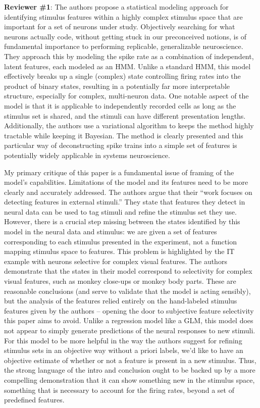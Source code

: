 \documentclass[12pt,a4paper]{article}
\begin{document}
{\bf Reviewer \#1}: The authors propose a statistical modeling approach for identifying stimulus features within a highly complex stimulus space that are important for a set of neurons under study. Objectively searching for what neurons actually code, without getting stuck in our preconceived notions, is of fundamental importance to performing replicable, generalizable neuroscience. They approach this by modeling the spike rate as a combination of independent, latent features, each modeled as an HMM. Unlike a standard HMM, this model effectively breaks up a single (complex) state controlling firing rates into the product of binary states, resulting in a potentially far more interpretable structure, especially for complex, multi-neuron data. One notable aspect of the model is that it is applicable to independently recorded cells as long as the stimulus set is shared, and the stimuli can have different presentation lengths. Additionally, the authors use a variational algorithm to keeps the method highly tractable while keeping it Bayesian. The method is clearly presented and this particular way of deconstructing spike trains into a simple set of features is potentially widely applicable in systems neuroscience.

My primary critique of this paper is a fundamental issue of framing of the model’s capabilities. Limitations of the model and its features need to be more clearly and accurately addressed. The authors argue that their “work focuses on detecting features in external stimuli.” They state that features they detect in neural data can be used to tag stimuli and refine the stimulus set they use. However, there is a crucial step missing between the states identified by this model in the neural data and stimulus: we are given a set of features corresponding to each stimulus presented in the experiment, not a function mapping stimulus space to features. This problem is highlighted by the IT example with neurons selective for complex visual features. The authors demonstrate that the states in their model correspond to selectivity for complex visual features, such as monkey close-ups or monkey body parts. These are reasonable conclusions (and serve to validate that the model is acting sensibly), but the analysis of the features relied entirely on the hand-labeled stimulus features given by the authors – opening the door to subjective feature selectivity this paper aims to avoid. Unlike a regression model like a GLM, this model does not appear to simply generate predictions of the neural responses to new stimuli. For this model to be more helpful in the way the authors suggest for refining stimulus sets in an objective way without a priori labels, we’d like to have an objective estimate of whether or not a feature is present in a new stimulus. Thus, the strong language of the intro and conclusion ought to be backed up by a more compelling demonstration that it can show something new in the stimulus space, something that is necessary to account for the firing rates, beyond a set of predefined features.
\end{document}
